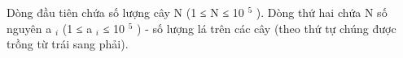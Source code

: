 Dòng đầu tiên chứa số lượng cây N (1 ≤ N ≤ 10   $^    5   $   ). Dòng thứ hai chứa N số nguyên a   $_    i   $   (1 ≤ a   $_    i   $   ≤ 10   $^    5   $   ) - số lượng lá trên các cây (theo thứ tự chúng được trồng từ trái sang phải).  

\